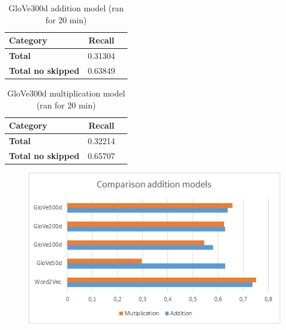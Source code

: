 \begin{center}
    \begin{table}[h!]
        \begin{tabular}{| l | c | r}
        	\hline
        	\textbf{Category} &    \textbf{Recall}\\ \hline
        	\textbf{Total}				& 0.31304 \\
        	\textbf{Total no skipped}	& 0.63849 \\ \hline
        \end{tabular}
    \caption{GloVe300d addition model (ran for 20 min)}
    \label{table:glove300d_addition}
    \end{table}
    
    \begin{table}[h!]
        \begin{tabular}{| l | c | r}
        	\hline
        	\textbf{Category} &    \textbf{Recall}\\ \hline
        	\textbf{Total}				& 0.32214 \\
        	\textbf{Total no skipped}	& 0.65707 \\ \hline
        \end{tabular}
    \caption{GloVe300d multiplication model (ran for 20 min)}
    \label{table:glove300d_multiplication}
    \end{table}
\end{center}

\begin{figure}[ht!]
	\centering
	\includegraphics[width=130mm]{images/chart1.png}
	\caption{}
\end{figure}
